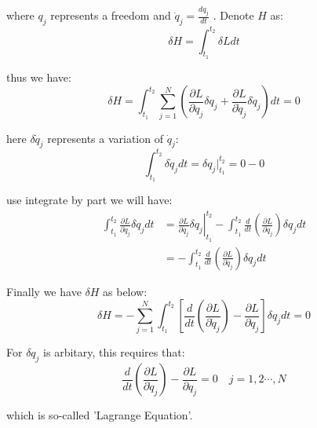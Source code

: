 where $q_j$ represents a freedom and $\dot{q}_j=\frac{d q_j}{dt}$ . Denote $H$ as:
\begin{equation}
    \delta H = \int_{t_1}^{t_2} \delta L dt
\end{equation}

thus we have:
\begin{equation}
    \delta H=
    \int_{t_1}^{t_2}
    \sum_{j=1}^N\left(
      \frac{\partial L}{\partial q_j}\delta q_j
      +
      \frac{\partial L}{\partial \dot{q}_j}\delta \dot{q}_j  
    \right)
    dt=0
\end{equation}

here $\delta \dot{q}_j$ represents a variation of $\dot{q}_j$:
\begin{equation}
    \int_{t_1}^{t_2}
    \delta \dot{q}_j dt=
    \delta q_j|_{t_1}^{t_2} = 0-0
\end{equation}

use integrate by part we will have:
\begin{equation}
    \begin{aligned}
        \int_{t_1}^{t_2}
    \frac{\partial L}{\partial \dot{q}_j}\delta \dot{q}_j dt
    &=
    \left.
    \frac{\partial L}{\partial \dot{q}_j}\delta q_j
    \right|_{t_1}^{t_2}
    -
    \int_{t_1}^{t_2}
    \frac{d}{dt}
    \left(
        \frac{\partial L}{\partial \dot{q}_j}
    \right)\delta q_j
    dt\\
    &=
    -
    \int_{t_1}^{t_2}
    \frac{d}{dt}
    \left(
        \frac{\partial L}{\partial \dot{q}_j}
    \right)\delta q_j dt
    \end{aligned}
\end{equation}

Finally we have $\delta H$ as below:
\begin{equation}
    \delta H
    =
    -\sum_{j=1}^N
    \int_{t_1}^{t_2}
    \left[
        \frac{d}{dt}
        \left(
        \frac{\partial L}{\partial \dot{q}_j}
        \right)
        -
        \frac{\partial L}{\partial q_j}
    \right]\delta q_j
    dt=0
\end{equation}

For $\delta q_j$ is arbitary, this requires that:
\begin{equation}
    \label{Lagrange}
    \frac{d}{dt}
        \left(
        \frac{\partial L}{\partial \dot{q}_j}
        \right)
        -
        \frac{\partial L}{\partial q_j}=0\quad j=1,2\cdots,N
\end{equation}

which is so-called 'Lagrange Equation'.

